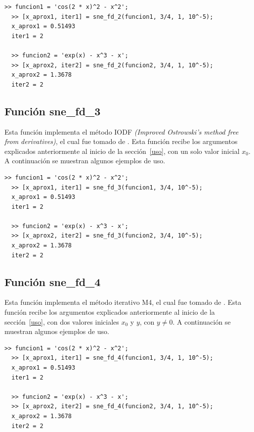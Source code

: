 \documentclass[12pt]{article}
\begin{document}
\begin{minipage}{\linewidth}
\begin{lstlisting}[frame = single]
  >> funcion1 = 'cos(2 * x)^2 - x^2';
  >> [x_aprox1, iter1] = sne_fd_2(funcion1, 3/4, 1, 10^-5);
  x_aprox1 = 0.51493
  iter1 = 2

  >> funcion2 = 'exp(x) - x^3 - x';
  >> [x_aprox2, iter2] = sne_fd_2(funcion2, 3/4, 1, 10^-5);
  x_aprox2 = 1.3678
  iter2 = 2

\end{lstlisting}
\end{minipage}

\subsection{Función sne\_fd\_3}
Esta función implementa el método IODF \textit{(Improved Ostrowski's method free from derivatives)}, el cual fue tomado de \cite{cordero2012steffensen}. Esta función recibe los argumentos explicados anteriormente al inicio de la sección~\ref{uso}, con un solo valor inicial $x_{0}$. A continuación se muestran algunos ejemplos de uso.

\begin{minipage}{\linewidth}
\begin{lstlisting}[frame = single]
  >> funcion1 = 'cos(2 * x)^2 - x^2';
  >> [x_aprox1, iter1] = sne_fd_3(funcion1, 3/4, 10^-5);
  x_aprox1 = 0.51493
  iter1 = 2

  >> funcion2 = 'exp(x) - x^3 - x';
  >> [x_aprox2, iter2] = sne_fd_3(funcion2, 3/4, 10^-5);
  x_aprox2 = 1.3678
  iter2 = 2
\end{lstlisting}
\end{minipage}

\subsection{Función sne\_fd\_4}
Esta función implementa el método iterativo M4, el cual fue tomado de \cite{bakhtiari2017widening}. Esta función recibe los argumentos explicados anteriormente al inicio de la sección~\ref{uso}, con dos valores iniciales $x_{0}$ y $y$, con $y \neq 0$. A continuación se muestran algunos ejemplos de uso.

\begin{minipage}{\linewidth}
\begin{lstlisting}[frame = single]
  >> funcion1 = 'cos(2 * x)^2 - x^2';
  >> [x_aprox1, iter1] = sne_fd_4(funcion1, 3/4, 1, 10^-5);
  x_aprox1 = 0.51493
  iter1 = 2

  >> funcion2 = 'exp(x) - x^3 - x';
  >> [x_aprox2, iter2] = sne_fd_4(funcion2, 3/4, 1, 10^-5);
  x_aprox2 = 1.3678
  iter2 = 2
\end{lstlisting}
\end{minipage}
\end{document}
